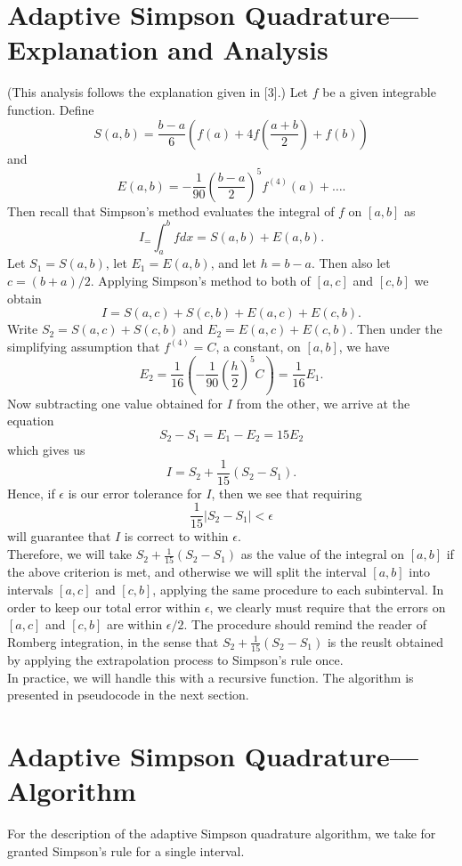 \documentclass[11pt]{article} %
\begin{document}
\section{Adaptive Simpson Quadrature---Explanation and Analysis}
(This analysis follows the explanation given in [3].) Let $f$ be a given integrable function. Define
$$S(a,b) = \frac{b-a}{6}\left(f(a) +4f\left(\frac{a+b}{2}\right) + f(b)\right)$$
and
$$E(a,b) = -\frac{1}{90}\left(\frac{b-a}{2}\right)^5 f^{(4)}(a) + \dots.$$
Then recall that Simpson's method evaluates the integral of $f$ on $[a,b]$ as
$$I_= \int_a^b f dx = S(a,b) +E(a,b).$$
Let $S_1 = S(a,b)$, let $E_1 = E(a,b)$, and let $h = b-a$. Then also let $c = (b+a)/2$. Applying Simpson's method to both of
$[a,c]$ and $[c,b]$ we obtain
$$I  = S(a,c) + S(c,b) + E(a,c) + E(c,b).$$
Write $S_2 = S(a,c) + S(c,b)$ and $E_2 = E(a,c) + E(c,b)$. Then under the simplifying assumption that $f^(4) = C$, a constant, on
$[a,b]$, we have
$$E_2 = \frac{1}{16}\left(-\frac{1}{90} \left(\frac{h}{2}\right)^5 C\right) = \frac{1}{16}E_1.$$
Now subtracting one value obtained for $I$ from the other, we arrive at the equation
$$S_2 - S_1 = E_1 - E_2 = 15E_2$$
which gives us
$$I = S_2 + \frac{1}{15}(S_2 - S_1).$$
Hence, if $\epsilon$ is our error tolerance for $I$, then we see that requiring
$$\frac{1}{15}\left|S_2 - S_1\right| < \epsilon$$
will guarantee that $I$ is correct to within $\epsilon$.\\
Therefore, we will take $ S_2 + \frac{1}{15}(S_2 - S_1)$ as the value of the integral on $[a,b]$ if the above criterion is met,
and otherwise we will split the interval $[a,b]$ into intervals $[a,c]$ and $[c,b]$, applying the same procedure to each subinterval. In 
order to keep our total error within $\epsilon$, we clearly must require that the errors on $[a,c]$ and $[c,b]$ are within $\epsilon/2$.
The procedure should remind the reader of Romberg integration, in the sense that $S_2 + \frac{1}{15}(S_2 - S_1)$ is the reuslt
obtained by applying the extrapolation process to Simpson's rule once.\\
In practice, we will handle this with a recursive function. The algorithm is presented in pseudocode in the next section.

\section{Adaptive Simpson Quadrature---Algorithm}
For the description of the adaptive Simpson quadrature algorithm, we take for granted Simpson's rule for a single interval.\\
\end{document}
